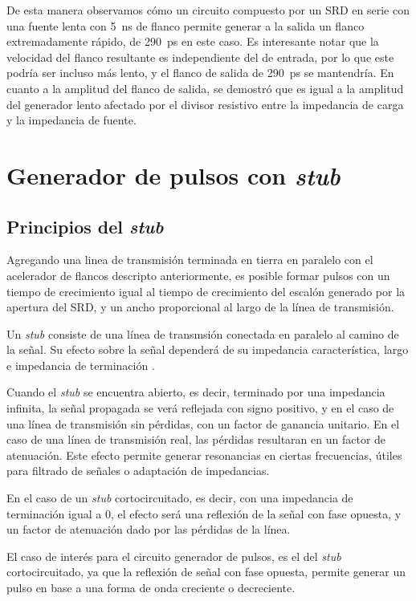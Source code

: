 De esta manera observamos cómo un circuito compuesto por un SRD en serie con una
fuente lenta con \qty{5}{\nano\second} de flanco permite generar a la salida un
flanco extremadamente rápido, de \qty{290}{\pico\second} en este caso. Es
interesante notar que la velocidad del flanco resultante es independiente del de
entrada, por lo que este podría ser incluso más lento, y el flanco de salida de
\qty{290}{\pico\second} se mantendría. En cuanto a la amplitud del flanco de
salida, se demostró que es igual a la amplitud del generador lento afectado por
el divisor resistivo entre la impedancia de carga y la impedancia de fuente.

\section{Generador de pulsos con \textit{stub}}
\label{sec:generador_pulsos_stub}

\subsection{Principios del \textit{stub}}

Agregando una linea de transmisión terminada en tierra en paralelo con el
acelerador de flancos descripto anteriormente, es posible formar pulsos con un
tiempo de crecimiento igual al tiempo de crecimiento del escalón generado por la
apertura del SRD, y un ancho proporcional al largo de la línea de transmisión.

Un \textit{stub} consiste de una línea de transmsión conectada en paralelo al
camino de la señal. Su efecto sobre la señal dependerá de su impedancia
característica, largo e impedancia de terminación \cite{pozar2011}.

Cuando el \textit{stub} se encuentra abierto, es decir, terminado por una
impedancia infinita, la señal propagada se verá reflejada con signo positivo, y
en el caso de una línea de transmisión sin pérdidas, con un factor de ganancia
unitario. En el caso de una línea de transmisión real, las pérdidas resultaran
en un factor de atenuación. Este efecto permite generar
resonancias en ciertas frecuencias, útiles para filtrado de señales o adaptación
de impedancias.

En el caso de un \textit{stub} cortocircuitado, es decir, con una impedancia de
terminación igual a $0$, el efecto será una reflexión de la señal con fase
opuesta, y un factor de atenuación dado por las pérdidas de la línea.

El caso de interés para el circuito generador de pulsos, es el del \textit{stub}
cortocircuitado, ya que la reflexión de señal con fase opuesta, permite generar
un pulso en base a una forma de onda creciente o decreciente.

